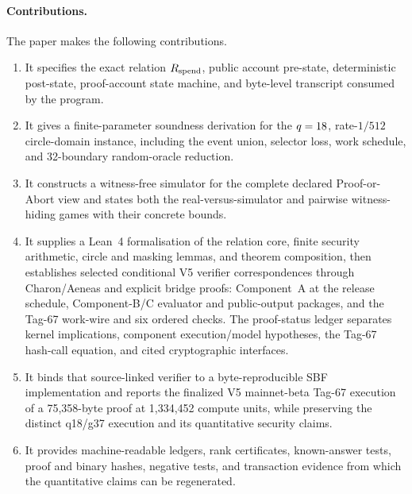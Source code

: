 \paragraph{Contributions.}
The paper makes the following contributions.

\begin{enumerate}[leftmargin=*,itemsep=0.45em]
  \item It specifies the exact relation $R_{\mathrm{spend}}$, public account pre-state,
  deterministic post-state, proof-account state machine, and byte-level
  transcript consumed by the program.

  \item It gives a finite-parameter soundness derivation for the
  $q=18$, rate-$1/512$ circle-domain instance, including the
  event union, selector loss, work schedule, and 32-boundary random-oracle
  reduction.

  \item It constructs a witness-free simulator for the complete declared
  Proof-or-Abort view and states both the real-versus-simulator and pairwise
  witness-hiding games with their concrete bounds.

  \item It supplies a Lean~4 formalisation of the relation core, finite
  security arithmetic, circle and masking lemmas, and theorem composition,
  then establishes selected conditional V5 verifier correspondences through
  Charon/Aeneas and explicit bridge proofs: Component~A at the release
  schedule, Component-B/C evaluator and public-output packages, and the Tag-67
  work-wire and six ordered checks.  The proof-status ledger separates kernel
  implications, component execution/model hypotheses, the Tag-67 hash-call
  equation, and cited cryptographic interfaces.

  \item It binds that source-linked verifier to a byte-reproducible SBF
  implementation and reports the finalized V5 mainnet-beta Tag-67 execution
  of a 75,358-byte proof at 1,334,452 compute units, while preserving the
  distinct q18/g37 execution and its quantitative security claims.

  \item It provides machine-readable ledgers, rank certificates, known-answer
  tests, proof and binary hashes, negative tests, and transaction evidence from
  which the quantitative claims can be regenerated.
\end{enumerate}

